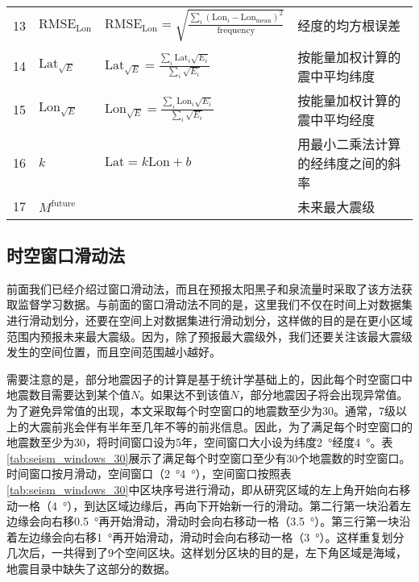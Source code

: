 \begin{sidewaystable}[htpb]
\begin{tabular}{llll}
  13 & $\mathrm{RMSE}_{\mathrm{Lon}}$ & $\displaystyle \mathrm{RMSE}_{\mathrm{Lon}}=\sqrt{\frac{\sum_i{(\mathrm{Lon}_i-\mathrm{Lon}_\mathrm{mean})}^2}{\mathrm{frequency}}}$ &  经度的均方根误差 \\ 
  14 & $\mathrm{Lat}_{\sqrt{E}}$ & $\displaystyle \mathrm{Lat}_{\sqrt{E}}=\frac{\sum_i{\mathrm{Lat}_i\sqrt{E_i}}}{\sum_i{\sqrt{E_i}}}$ & 按能量加权计算的震中平均纬度 \\ 
  15 & $\mathrm{Lon}_{\sqrt{E}}$ & $\displaystyle \mathrm{Lon}_{\sqrt{E}}=\frac{\sum_i{\mathrm{Lon}_i\sqrt{E_i}}}{\sum_i{\sqrt{E_i}}}$ & 按能量加权计算的震中平均经度 \\ 
  16 & $k$ & $\mathrm{Lat}=k\mathrm{Lon}+b$ & 用最小二乘法计算的经纬度之间的斜率 \\
  17 & $M^{\mathrm{future}}$ & & 未来最大震级 \\
  \bottomrule
  \end{tabular} 
\end{sidewaystable}


\subsection{时空窗口滑动法}\label{sec:seism_slide}

前面我们已经介绍过窗口滑动法，而且在预报太阳黑子和泉流量时采取了该方法获取监督学习数据。与前面的窗口滑动法不同的是，这里我们不仅在时间上对数据集进行滑动划分，还要在空间上对数据集进行滑动划分，这样做的目的是在更小区域范围内预报未来最大震级。因为，除了预报最大震级外，我们还要关注该最大震级发生的空间位置，而且空间范围越小越好。

需要注意的是，部分地震因子的计算是基于统计学基础上的，因此每个时空窗口中地震数目需要达到某个值$N$。如果达不到该值$N$，部分地震因子将会出现异常值。为了避免异常值的出现，本文采取每个时空窗口的地震数至少为30。通常，7级以上的大震前兆会伴有半年至几年不等的前兆信息。因此，为了满足每个时空窗口的地震数至少为30，将时间窗口设为5年，空间窗口大小设为纬度\SI{2}{\degree}\times 经度\SI{4}{\degree}。表\ref{tab:seism_windows_30}展示了满足每个时空窗口至少有30个地震数的时空窗口。时间窗口按月滑动，空间窗口（\SI{2}{\degree}\times \SI{4}{\degree}），空间窗口按照表\ref{tab:seism_windows_30}中区块序号进行滑动，即从研究区域的左上角开始向右移动一格（\SI{4}{\degree}），到达区域边缘后，再向下开始新一行的滑动。第二行第一块沿着左边缘会向右移\SI{0.5}{\degree}再开始滑动，滑动时会向右移动一格（\SI{3.5}{\degree}）。第三行第一块沿着左边缘会向右移\SI{1}{\degree}再开始滑动，滑动时会向右移动一格（\SI{3}{\degree}）。这样重复划分几次后，一共得到了9个空间区块。这样划分区块的目的是，左下角区域是海域，地震目录中缺失了这部分的数据。

